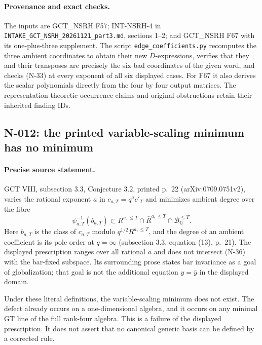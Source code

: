 \paragraph{Provenance and exact checks.}
The inputs are GCT\_NSRH F57; INT-NSRH-4 in
\nolinkurl{INTAKE_GCT_NSRH_20261121_part3.md}, sections 1--2;
and GCT\_NSRH F67 with its one-plus-three supplement.  The script
\nolinkurl{edge_coefficients.py} recomputes the three ambient coordinates
to obtain their new $D$-expressions, verifies that they and their
transposes are precisely the six bad coordinates of the given word,
and checks (N-33) at every exponent of all six displayed cases.
For F67 it also derives the scalar polynomials directly from the four
by four output matrices.  The representation-theoretic occurrence
claims and original obstructions retain their inherited finding IDs.


\subsection{N-012: the printed variable-scaling minimum has no minimum}
\label{sec:nonstandard-viii-scaling}

\paragraph{Precise source statement.}
GCT VIII, subsection 3.3, Conjecture 3.2, printed p.~22
(arXiv:0709.0751v2), varies the rational exponent $a$ in
$c_{a,T}=q^a c'_T$ and minimizes ambient degree over the fibre
\[
 \psi_{a,T}^{-1}(b_{a,T})\subset
 R^{a,\le T}\cap\bar R^{a,\le T}\cap\mathcal B^{\le T}_{\mathbb Q}.
 \tag{N-36}
\]
Here $b_{a,T}$ is the class of $c_{a,T}$ modulo
$q^{1/2}R^{a,\le T}$, and the degree of an ambient coefficient is
its pole order at $q=\infty$ (subsection 3.3, equation (13), p.~21).
The displayed prescription ranges over all rational $a$ and does
not intersect (N-36) with the bar-fixed subspace.  Its surrounding
prose states bar invariance as a goal of globalization; that goal is
not the additional equation $y=\bar y$ in the displayed domain.

Under these literal definitions, the variable-scaling minimum does
not exist.  The defect already occurs on a one-dimensional algebra,
and it occurs on any minimal GT line of the full rank-four algebra.
This is a failure of the displayed prescription.  It does not assert
that no canonical generic basis can be defined by a corrected rule.

